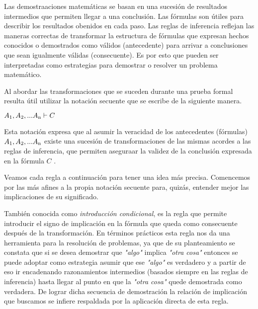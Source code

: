Las demostraaciones matemáticas se basan en una sucesión de resultados intermedios que permiten llegar a una conclusión. Las fórmulas son útiles para describir los resultados obenidos en cada paso. Las reglas de inferencia reflejan las maneras correctas de transformar la estructura de fórmulas que expresan hechos conocidos o demostrados como válidos (antecedente) para arrivar a conclusiones que sean igualmente válidas (consecuente). Es por esto que pueden ser interpretadas como estrategias para demostrar o resolver un problema matemático.

Al abordar las transformaciones que se suceden durante una prueba formal resulta útil utilizar la notación secuente que se escribe de la siguiente manera.

\begin{center}
$A\textsubscript{1}, A\textsubscript{2}, ... A\textsubscript{n} \vdash C$
\end{center}

Esta notación expresa que al asumir la veracidad de los antecedentes (fórmulas) $A\textsubscript{1}, A\textsubscript{2}, ... A\textsubscript{n}$ existe una sucesión de transformaciones de las mismas acordes a las reglas de inferencia, que permiten aseguraar la validez de la conclusión expresada en la fórmula $C$ .

Veamos cada regla a continuación para tener una idea más precisa. Comencemos por las más afines a la propia notación secuente para, quizás, entender mejor las implicaciones de su significado.



También conocida como \textit{introducción condicional}, es la regla que permite introducir el signo de implicación en la fórmula que queda como consecuente después de la transformación. En términos prácticos esta regla nos da una herramienta para la resolución de problemas, ya que de su planteamiento se constata que si se desea demostrar que \textit{"algo"} implica \textit{"otra cosa"} entonces se puede adoptar como estrategia asumir que ese \textit{"algo"} es verdadero y a partir de eso ir encadenando razonamientos intermedios (basados siempre en las reglas de inferencia) hasta llegar al punto en que la \textit{"otra cosa"} quede demostrada como verdadera. De lograr dicha secuencia de demostración la relación de implicación que buscamos se infiere respaldada por la aplicación directa de esta regla.



